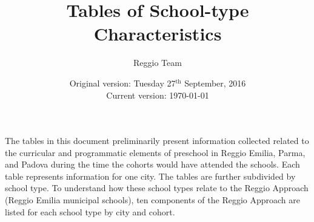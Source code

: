 




\title{Tables of School-type Characteristics}
\author{Reggio Team}
\date{Original version: Tuesday 27$^{\text{th}}$ September, 2016 \\ Current version: \today}
\maketitle

\doublespacing

The tables in this document preliminarily present information collected related to the curricular and programmatic elements of preschool in Reggio Emilia, Parma, and Padova during the time the cohorts would have attended the schools. Each table represents information for one city. The tables are further subdivided by school type. To understand how these school types relate to the Reggio Approach (Reggio Emilia municipal schools), ten components of the Reggio Approach are listed for each school type by city and cohort. 

